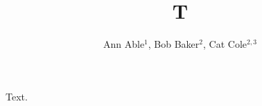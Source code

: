\documentclass[sigconf]{acmart}
\begin{document}
\title{T}
\author{Ann Able$^1$, Bob Baker$^2$, Cat Cole$^{2,3}$}
\maketitle
Text.
\end{document}
